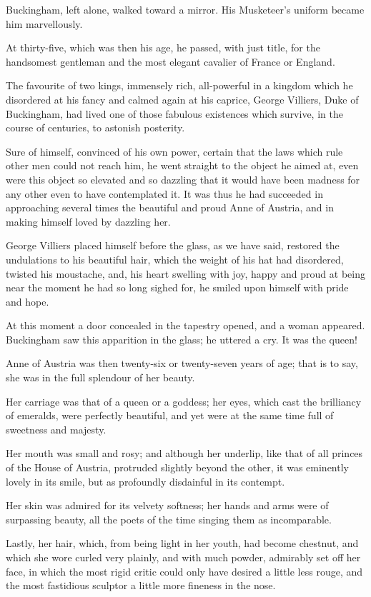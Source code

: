 Buckingham, left alone, walked toward a mirror. His Musketeer's uniform became him marvellously. 

At thirty-five, which was then his age, he passed, with just title, for the handsomest gentleman and the most elegant cavalier of France or England. 

The favourite of two kings, immensely rich, all-powerful in a kingdom which he disordered at his fancy and calmed again at his caprice, George Villiers, Duke of Buckingham, had lived one of those fabulous existences which survive, in the course of centuries, to astonish posterity. 

Sure of himself, convinced of his own power, certain that the laws which rule other men could not reach him, he went straight to the object he aimed at, even were this object so elevated and so dazzling that it would have been madness for any other even to have contemplated it. It was thus he had succeeded in approaching several times the beautiful and proud Anne of Austria, and in making himself loved by dazzling her. 

George Villiers placed himself before the glass, as we have said, restored the undulations to his beautiful hair, which the weight of his hat had disordered, twisted his moustache, and, his heart swelling with joy, happy and proud at being near the moment he had so long sighed for, he smiled upon himself with pride and hope. 

At this moment a door concealed in the tapestry opened, and a woman appeared. Buckingham saw this apparition in the glass; he uttered a cry. It was the queen! 

Anne of Austria was then twenty-six or twenty-seven years of age; that is to say, she was in the full splendour of her beauty. 

Her carriage was that of a queen or a goddess; her eyes, which cast the brilliancy of emeralds, were perfectly beautiful, and yet were at the same time full of sweetness and majesty. 

Her mouth was small and rosy; and although her underlip, like that of all princes of the House of Austria, protruded slightly beyond the other, it was eminently lovely in its smile, but as profoundly disdainful in its contempt. 

Her skin was admired for its velvety softness; her hands and arms were of surpassing beauty, all the poets of the time singing them as incomparable. 

Lastly, her hair, which, from being light in her youth, had become chestnut, and which she wore curled very plainly, and with much powder, admirably set off her face, in which the most rigid critic could only have desired a little less rouge, and the most fastidious sculptor a little more fineness in the nose. 

